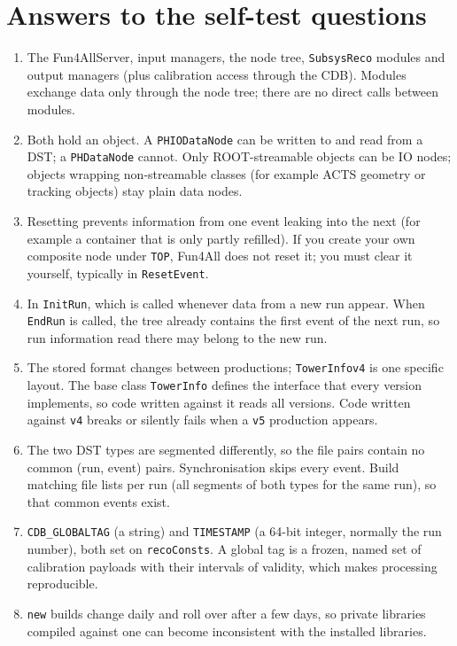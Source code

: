 \documentclass[11pt,letterpaper]{article}
\begin{document}
\appendix
\section{Answers to the self-test questions}
\begin{enumerate}[label=A\arabic*.]
\item The Fun4AllServer, input managers, the node tree, \texttt{SubsysReco} modules and output managers (plus calibration access through the CDB).
Modules exchange data only through the node tree; there are no direct calls between modules.
\item Both hold an object. A \texttt{PHIODataNode} can be written to and read from a DST; a \texttt{PHDataNode} cannot.
Only ROOT-streamable objects can be IO nodes; objects wrapping non-streamable classes (for example ACTS geometry or tracking objects) stay plain data nodes.
\item Resetting prevents information from one event leaking into the next (for example a container that is only partly refilled).
If you create your own composite node under \texttt{TOP}, Fun4All does not reset it; you must clear it yourself, typically in \texttt{ResetEvent}.
\item In \texttt{InitRun}, which is called whenever data from a new run appear. When \texttt{EndRun} is called, the tree already contains the first event of the next run,
so run information read there may belong to the new run.
\item The stored format changes between productions; \texttt{TowerInfov4} is one specific layout.
The base class \texttt{TowerInfo} defines the interface that every version implements, so code written against it reads all versions.
Code written against \texttt{v4} breaks or silently fails when a \texttt{v5} production appears.
\item The two DST types are segmented differently, so the file pairs contain no common (run, event) pairs. Synchronisation skips every event.
Build matching file lists per run (all segments of both types for the same run), so that common events exist.
\item \texttt{CDB\_GLOBALTAG} (a string) and \texttt{TIMESTAMP} (a 64-bit integer, normally the run number), both set on \texttt{recoConsts}.
A global tag is a frozen, named set of calibration payloads with their intervals of validity, which makes processing reproducible.
\item \texttt{new} builds change daily and roll over after a few days, so private libraries compiled against one can become inconsistent with the installed libraries.

\end{enumerate}
\end{document}
